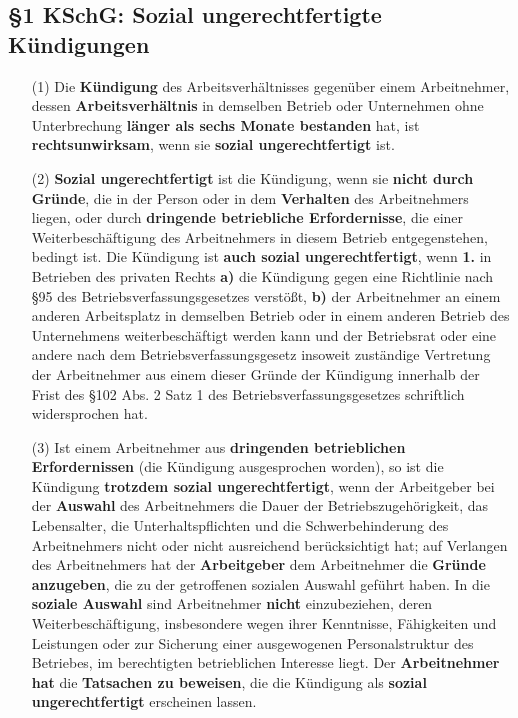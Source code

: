 \documentclass[a4paper, 12pt]{report}
\begin{document}
\subsection{\S 1 KSchG: Sozial ungerechtfertigte Kündigungen}

\begin{itemize}
    \item[(1)] Die \textbf{Kündigung} des Arbeitsverhältnisses gegenüber einem 
        Arbeitnehmer, dessen \textbf{Arbeitsverhältnis} in demselben Betrieb 
        oder Unternehmen ohne Unterbrechung \textbf{länger als sechs Monate 
        bestanden} hat, ist \textbf{rechtsunwirksam}, wenn sie \textbf{sozial 
        ungerechtfertigt} ist. 
    \item[(2)] \textbf{Sozial ungerechtfertigt} ist die Kündigung, wenn sie 
        \textbf{nicht durch Gründe}, die in der Person oder in dem 
        \textbf{Verhalten} des Arbeitnehmers liegen, oder durch 
        \textbf{dringende betriebliche Erfordernisse}, die einer 
        Weiterbeschäftigung des Arbeitnehmers in diesem Betrieb entgegenstehen, 
        bedingt ist. Die Kündigung ist \textbf{auch sozial ungerechtfertigt}, 
        wenn \textbf{1.} in Betrieben des privaten Rechts \textbf{a)} die 
        Kündigung gegen eine Richtlinie nach \S 95 des 
        Betriebsverfassungsgesetzes verstößt, \textbf{b)} der Arbeitnehmer an 
        einem anderen Arbeitsplatz in demselben Betrieb oder in einem anderen 
        Betrieb des Unternehmens weiterbeschäftigt werden kann und der 
        Betriebsrat oder eine andere nach dem Betriebsverfassungsgesetz insoweit
        zuständige Vertretung der Arbeitnehmer aus einem dieser Gründe der 
        Kündigung innerhalb der Frist des \S 102 Abs. 2 Satz 1 des 
        Betriebsverfassungsgesetzes schriftlich widersprochen hat. 
    \item[(3)] Ist einem Arbeitnehmer aus \textbf{dringenden betrieblichen 
        Erfordernissen} (die Kündigung ausgesprochen worden), so ist die 
        Kündigung \textbf{trotzdem sozial ungerechtfertigt}, wenn der 
        Arbeitgeber bei der \textbf{Auswahl} des Arbeitnehmers die Dauer der 
        Betriebszugehörigkeit, das Lebensalter, die Unterhaltspflichten und 
        die Schwerbehinderung des Arbeitnehmers nicht oder nicht ausreichend 
        berücksichtigt hat; auf Verlangen des Arbeitnehmers hat der 
        \textbf{Arbeitgeber} dem Arbeitnehmer die \textbf{Gründe anzugeben}, 
        die zu der getroffenen sozialen Auswahl geführt haben. In die 
        \textbf{soziale Auswahl} sind Arbeitnehmer \textbf{nicht} einzubeziehen, 
        deren Weiterbeschäftigung, insbesondere wegen ihrer Kenntnisse, 
        Fähigkeiten und Leistungen oder zur Sicherung einer ausgewogenen 
        Personalstruktur des Betriebes, im berechtigten betrieblichen Interesse 
        liegt.  Der \textbf{Arbeitnehmer hat} die \textbf{Tatsachen zu 
        beweisen}, die die Kündigung als \textbf{sozial ungerechtfertigt} 
        erscheinen lassen. 
\end{itemize}
\end{document}
